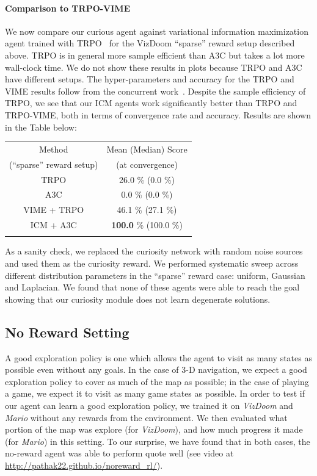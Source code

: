 \documentclass{article}
\begin{document}
\paragraph{Comparison to TRPO-VIME}
We now compare our curious agent against variational information maximization agent trained with TRPO~\cite{houthooft2016vime} for the VizDoom ``sparse'' reward setup described above.
TRPO is in general more sample efficient than A3C but takes a lot more wall-clock time.
We do not show these results in plots because TRPO and A3C have different setups.
The hyper-parameters and accuracy for the TRPO and VIME results follow from the concurrent work~\cite{fu2017ex2}.
Despite the sample efficiency of TRPO, we see that our ICM agents work significantly better than TRPO and TRPO-VIME, both in terms of convergence rate and accuracy.
Results are shown in the Table below:

\begin{center}
\footnotesize{
\begin{tabular}{cc}
\toprule
Method & Mean (Median) Score\\
(``sparse'' reward setup) & (at convergence)\\
\midrule
TRPO & \phantom{0}26.0 \% (\phantom{0}\phantom{0}0.0 \%)\\
A3C & \phantom{0}\phantom{0}0.0 \% (\phantom{0}\phantom{0}0.0 \%)\\
VIME + TRPO & \phantom{0}46.1 \% (\phantom{0}27.1 \%)\\
\midrule
ICM + A3C & \textbf{100.0} \% (100.0 \%)\\
\bottomrule
\label{tab:vime}
\end{tabular}
}
\end{center}

As a sanity check, we replaced the curiosity network with random noise sources and used them as the curiosity reward. We performed systematic sweep across different distribution parameters in the ``sparse'' reward case: uniform, Gaussian and Laplacian. We found that none of these agents were able to reach the goal showing that our curiosity module does not learn degenerate solutions.


\subsection{No Reward Setting}
\label{sec:noreward}
A good exploration policy is one which allows the agent to visit as many states as possible even without any goals. In the case of 3-D navigation, we expect a good exploration policy to cover as much of the map as possible; in the case of playing a game, we expect it to visit as many game states as possible. In order to test if our agent can learn a good exploration policy, we trained it on {\em VizDoom} and {\em Mario} without any rewards from the environment. We then evaluated what portion of the map was explore (for {\em VizDoom}), and how much progress it made (for {\em Mario}) in this setting.
To our surprise, we have found that in both cases, the no-reward agent was able to perform quote well (see video at \url{http://pathak22.github.io/noreward_rl/}).
\end{document}
